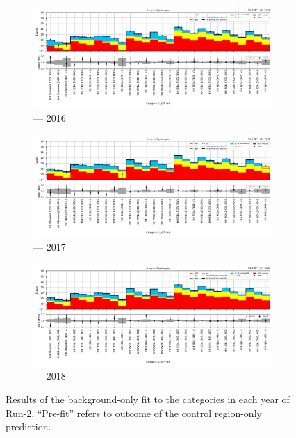 \begin{figure}[htbp]
    \centering
    \begin{subfigure}[b]{0.9\textwidth}
        \includegraphics[width=\textwidth]{chapters/higgstoinv/figures/mountain_ranges/2016/ttH/SR_tree_fit_b-abs_values_ttH_cats.pdf}
        \caption{\ttH --- 2016}
    \end{subfigure}

    \begin{subfigure}[b]{0.9\textwidth}
        \includegraphics[width=\textwidth]{chapters/higgstoinv/figures/mountain_ranges/2017/ttH/SR_tree_fit_b-abs_values_ttH_cats.pdf}
        \caption{\ttH --- 2017}
    \end{subfigure}

    \begin{subfigure}[b]{0.9\textwidth}
        \includegraphics[width=\textwidth]{chapters/higgstoinv/figures/mountain_ranges/2018/ttH/SR_tree_fit_b-abs_values_ttH_cats.pdf}
        \caption{\ttH --- 2018}
    \end{subfigure}
    \caption[Results of the background-only fit to the \ttH categories in each year of Run-2]{Results of the background-only fit to the \ttH categories in each year of Run-2. ``Pre-fit'' refers to outcome of the control region-only prediction.}
    \label{fig:htoinv_mountain_range_B_only_ttH_SR}
\end{figure}

